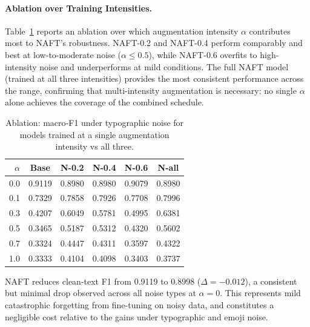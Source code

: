 \documentclass[sigconf]{acmart}
\begin{document}
\paragraph{Ablation over Training Intensities.}
Table~\ref{tab:ablation} reports an ablation over which
augmentation intensity $\alpha$ contributes most to NAFT's
robustness.
NAFT-0.2 and NAFT-0.4 perform comparably and best at low-to-moderate
noise ($\alpha \leq 0.5$), while NAFT-0.6 overfits to high-intensity
noise and underperforms at mild conditions.
The full NAFT model (trained at all three intensities) provides the
most consistent performance across the range, confirming that
multi-intensity augmentation is necessary: no single $\alpha$ alone
achieves the coverage of the combined schedule.

\begin{table}[h]
  \centering\footnotesize\setlength{\tabcolsep}{3pt}
  \caption{Ablation: macro-F1 under typographic noise for models
           trained at a single augmentation intensity vs all three.}
  \label{tab:ablation}
  \begin{tabular}{rccccc}
    \toprule
    $\alpha$ & \textbf{Base} & \textbf{N-0.2} & \textbf{N-0.4} &
               \textbf{N-0.6} & \textbf{N-all} \\
    \midrule
    0.0 & 0.9119 & 0.8980 & 0.8980 & 0.9079 & 0.8980 \\
    0.1 & 0.7329 & 0.7858 & 0.7926 & 0.7708 & 0.7996 \\
    0.3 & 0.4207 & 0.6049 & 0.5781 & 0.4995 & 0.6381 \\
    0.5 & 0.3465 & 0.5187 & 0.5312 & 0.4320 & 0.5602 \\
    0.7 & 0.3324 & 0.4447 & 0.4311 & 0.3597 & 0.4322 \\
    1.0 & 0.3333 & 0.4104 & 0.4098 & 0.3403 & 0.3737 \\
    \bottomrule
  \end{tabular}
\end{table}
NAFT reduces clean-text F1 from 0.9119 to 0.8998 ($\Delta=-0.012$),
a consistent but minimal drop observed across all noise types at
$\alpha=0$.
This represents mild catastrophic forgetting from fine-tuning on
noisy data, and constitutes a negligible cost relative to the
gains under typographic and emoji noise.
\end{document}
